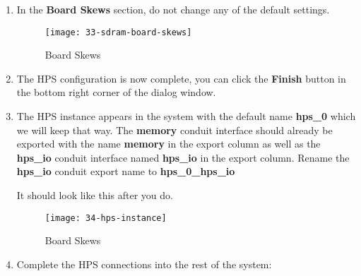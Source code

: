 \begin{flushleft}
\begin{enumerate}[
	label=\textbf{Step \arabic*.},
	leftmargin=*,
	widest={00},
	align=left]
\begin{figure}[H]
\centering
\texttt{[image: 32-sdram-board-sig-int]}
\caption{Channel Signal Integrity}
\label{fig:32-sdram-board-sig-int}
\end{figure}

\newpage

\item In the \textbf{Board Skews} section, do not change any of the default settings.

\begin{figure}[H]
\centering
\texttt{[image: 33-sdram-board-skews]}
\caption{Board Skews}
\label{fig:33-sdram-board-skews}
\end{figure}

\item The HPS configuration is now complete, you can click the \textbf{Finish} button in the bottom right corner of the dialog window.

\item The HPS instance appears in the system with the default name \textbf{hps\_0} which we will keep that way.  The \textbf{memory} conduit interface should already be exported with the name \textbf{memory} in the export column as well as the \textbf{hps\_io} conduit interface named \textbf{hps\_io} in the export column.  Rename the \textbf{hps\_io} conduit export name to \textbf{hps\_0\_hps\_io}

It should look like this after you do.

\begin{figure}[H]
\centering
\texttt{[image: 34-hps-instance]}
\caption{Board Skews}
\label{fig:34-hps-instance}
\end{figure}

\newpage

\item Complete the HPS connections into the rest of the system:

\begin{enumerate}[
	label=\textbf{Step \arabic{enumi}\alph*.},
	leftmargin=*,
	align=left]


\end{enumerate}
\end{enumerate}
\end{flushleft}
